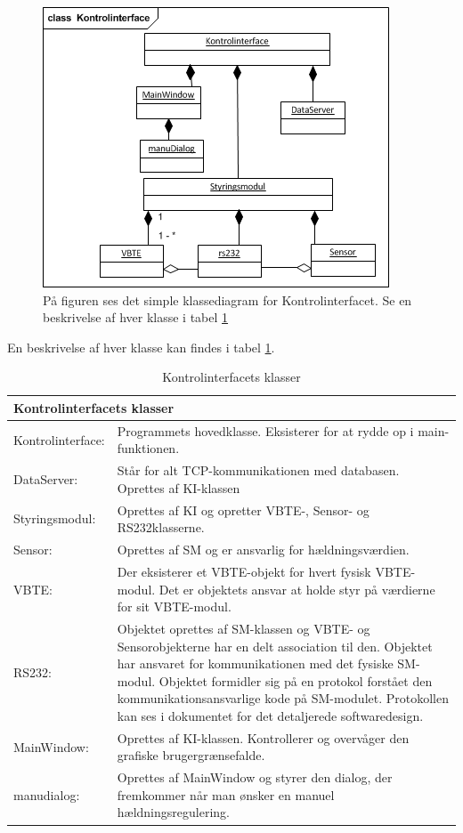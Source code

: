 \begin{figure}[htbp]
\centering
\label{fig:kd_simpel}
\includegraphics[width=.5\textwidth]{billeder/GUI/klassediagram_simpel}
\caption{På figuren ses det simple klassediagram for Kontrolinterfacet. Se en beskrivelse af hver klasse i tabel \ref{tabel:ki-klasser}}
\end{figure}

En beskrivelse af hver klasse kan findes i tabel \ref{tabel:ki-klasser}.\\
 
\begin{table}[H]
\centering
{}
\begin{tabular}{| p{3cm}  p{11cm}|}
\multicolumn{2}{l}{{\Large Kontrolinterfacets klasser}} \\\hline
Kontrolinterface:&Programmets hovedklasse. Eksisterer for at rydde op i main-funktionen.\\\hline
DataServer:&Står for alt TCP-kommunikationen med databasen. Oprettes af KI-klassen\\\hline
Styringsmodul:&Oprettes af KI og opretter VBTE-, Sensor- og RS232klasserne.\\\hline
Sensor:&Oprettes af SM og er ansvarlig for hældningsværdien.\\\hline
VBTE:&Der eksisterer et VBTE-objekt for hvert fysisk VBTE-modul. Det er objektets ansvar at holde styr på værdierne for sit VBTE-modul.\\\hline
RS232:&Objektet oprettes af SM-klassen og VBTE- og Sensorobjekterne har en delt association til den. Objektet har ansvaret for kommunikationen med det fysiske SM-modul. Objektet formidler sig på en protokol forstået den kommunikationsansvarlige kode på SM-modulet. Protokollen kan ses i dokumentet for det detaljerede softwaredesign.\\\hline
MainWindow:&Oprettes af KI-klassen. Kontrollerer og overvåger den grafiske brugergrænsefalde.\\\hline
manudialog:&Oprettes af MainWindow og styrer den dialog, der fremkommer når man ønsker en manuel hældningsregulering.\\\hline
\end{tabular}
\caption{Kontrolinterfacets klasser}
\label{tabel:ki-klasser}
\end{table}

